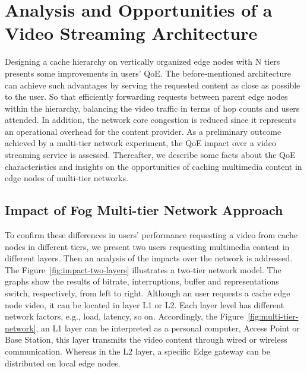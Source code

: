 \section{Analysis and Opportunities of a Video Streaming Architecture}
\label{sec:system-archi}


Designing a cache hierarchy on vertically organized edge nodes with N tiers presents some improvements in users’ QoE. The before-mentioned architecture can achieve such advantages by serving the requested content as close as possible to the user. So that efficiently forwarding requests between parent edge nodes within the hierarchy, balancing the video traffic in terms of hop counts and users attended. In addition, the network core congestion is reduced since it represents an operational overhead for the content provider.
As a preliminary outcome achieved by a multi-tier network experiment, the QoE impact over a video streaming service is assessed. Thereafter, we describe some facts about the QoE characteristics and insights on the opportunities of caching multimedia content in edge nodes of multi-tier networks.

\subsection{Impact of Fog Multi-tier Network Approach}

To confirm these differences in users' performance requesting a video from cache nodes in different tiers, we present two users requesting multimedia content in different layers. Then an analysis of the impacts over the network is addressed. The Figure~\ref{fig:impact-two-layers} illustrates a two-tier network model. The graphs show the results of bitrate, interruptions, buffer and representations switch, respectively, from left to right.%
Although an user requests a cache edge node video, it can be located in layer L1 or L2. Each layer level has different network factors, e.g., load, latency, so on. Accordingly, the Figure~\ref{fig:multi-tier-network}, an L1 layer can be interpreted as a personal computer, Access Point or Base Station, this layer transmits the video content through wired or wireless communication. Whereas in the L2 layer, a specific Edge gateway can be distributed on local edge nodes.

